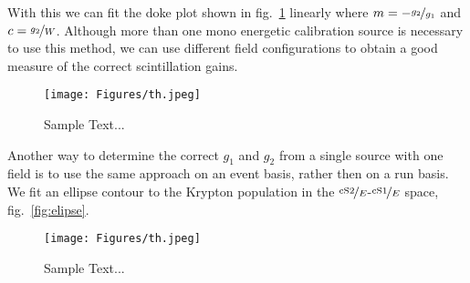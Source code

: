 With this we can fit the doke plot shown in fig.~\ref{fig:doke} linearly where $ m = - \nicefrac{g_2}{g_1} $ and $ c = \nicefrac{g_2}{W} $.  %
Although more than one mono energetic calibration source is necessary to use this method, we can use different field configurations to obtain a good measure of the correct scintillation gains.

\begin{figure}
\centering
\texttt{[image: Figures/th.jpeg]}  %
\caption[Doke plot]{
        Sample Text...
    }
\label{fig:doke}
\end{figure}

Another way to determine the correct $ g_1 $ and $ g_2 $ from a single source with one field is to use the same approach on an event basis, rather then on a run basis.
We fit an ellipse contour to the Krypton population in the $ \nicefrac{\mathrm{cS2}}{E} $-$ \nicefrac{\mathrm{cS1}}{E} $ space, fig.~\ref{fig:elipse}.

\begin{figure}
\centering
\texttt{[image: Figures/th.jpeg]}  %
\caption[Ellipse Fit]{
        Sample Text...
    }
\label{fig:ellipse}
\end{figure}



